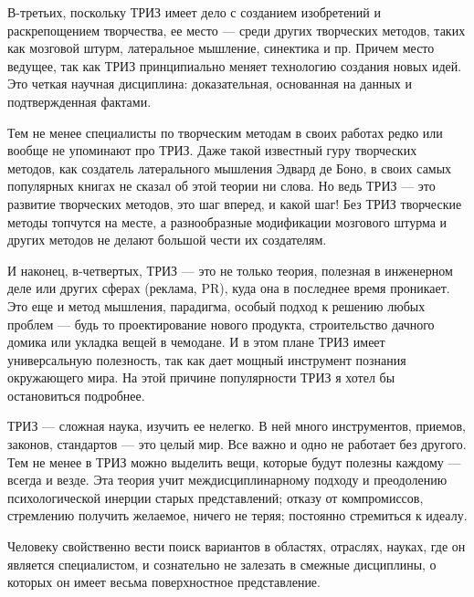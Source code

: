 В-третьих,  поскольку  ТРИЗ  имеет  дело  с  созданием  изобретений  и
раскрепощением творчества, ее место — среди других творческих методов,
таких как мозговой штурм, латеральное мышление, синектика и пр. Причем
место ведущее,  так как ТРИЗ принципиально  меняет технологию создания
новых идей.  Это четкая научная дисциплина:  доказательная, основанная
на данных и подтвержденная фактами.

Тем не менее  специалисты по творческим методам в  своих работах редко
или вообще не упоминают про ТРИЗ. Даже такой известный гуру творческих
методов, как создатель  латерального мышления Эдвард де  Боно, в своих
самых популярных  книгах не сказал  об этой  теории ни слова.  Но ведь
ТРИЗ  — это  развитие  творческих  методов, это  шаг  вперед, и  какой
шаг! Без  ТРИЗ творческие  методы топчутся  на месте,  а разнообразные
модификации мозгового штурма и других  методов не делают большой чести
их создателям.

И  наконец, в-четвертых,  ТРИЗ  —  это не  только  теория, полезная  в
инженерном деле или других сферах  (реклама, PR), куда она в последнее
время проникает. Это еще и  метод мышления, парадигма, особый подход к
решению  любых  проблем  —  будь то  проектирование  нового  продукта,
строительство дачного  домика или укладка  вещей в чемодане. И  в этом
плане  ТРИЗ  имеет  универсальную  полезность,  так  как  дает  мощный
инструмент  познания окружающего  мира. На  этой причине  популярности
ТРИЗ я хотел бы остановиться подробнее.

ТРИЗ —  сложная наука, изучить  ее нелегко. В ней  много инструментов,
приемов, законов,  стандартов —  это целый  мир. Все  важно и  одно не
работает  без  другого. Тем  не  менее  в  ТРИЗ можно  выделить  вещи,
которые  будут полезны  каждому  —  всегда и  везде.  Эта теория  учит
междисциплинарному  подходу  и   преодолению  психологической  инерции
старых  представлений;  отказу  от компромиссов,  стремлению  получить
желаемое, ничего не теряя; постоянно стремиться к идеалу.

Человеку  свойственно  вести  поиск вариантов  в  областях,  отраслях,
науках,  где  он  является  специалистом, и  сознательно  не  залезать
в  смежные  дисциплины,  о   которых  он  имеет  весьма  поверхностное
представление.

